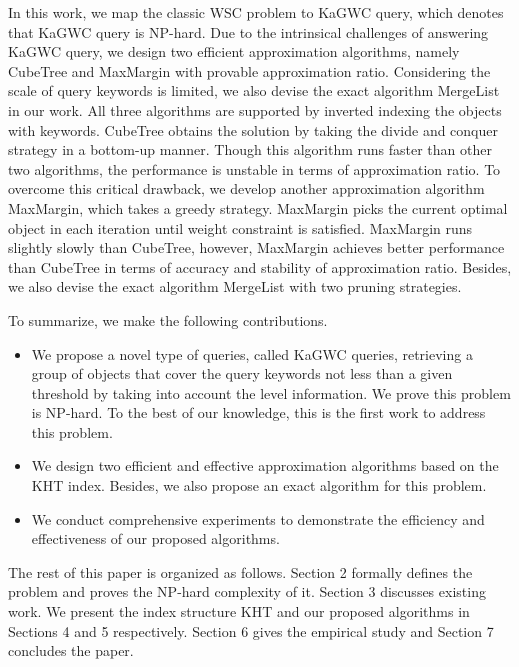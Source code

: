 In this work, we map the classic WSC problem to KaGWC query, which denotes that KaGWC query is NP-hard. Due to the intrinsical challenges of answering KaGWC query, we design two efficient approximation algorithms, namely CubeTree and MaxMargin with provable approximation ratio. Considering the scale of query keywords is limited, we also devise the exact algorithm MergeList in our work. All three algorithms are supported by inverted indexing the objects with keywords. CubeTree obtains the solution by taking the divide and conquer strategy in a bottom-up manner. Though this algorithm runs faster than other two algorithms, the performance is unstable in terms of approximation ratio. To overcome this critical drawback, we develop another approximation algorithm MaxMargin, which takes a greedy strategy. MaxMargin picks the current optimal object in each iteration until weight constraint is satisfied. MaxMargin runs slightly slowly than CubeTree, however, MaxMargin achieves better performance than CubeTree in terms of accuracy and stability of approximation ratio. Besides, we also devise the exact algorithm MergeList with two pruning strategies.

To summarize, we make the following contributions.
\begin{itemize}
    \item We propose a novel type of queries, called KaGWC queries, retrieving a group of objects that cover the query keywords not less than a given threshold by taking into account the level information. We prove this problem is NP-hard. To the best of our knowledge, this is the first work to address this problem.
    \item We design two efficient and effective approximation algorithms based on the KHT index. Besides, we also propose an exact algorithm for this problem.
    \item We conduct comprehensive experiments to demonstrate the efficiency and effectiveness of our proposed algorithms.
\end{itemize}

The rest of this paper is organized as follows. Section 2 formally defines the problem and proves the NP-hard complexity of it. Section 3 discusses existing work. We present the index structure KHT and our proposed algorithms in Sections 4 and 5 respectively. Section 6 gives the empirical study and Section 7 concludes the paper.


















